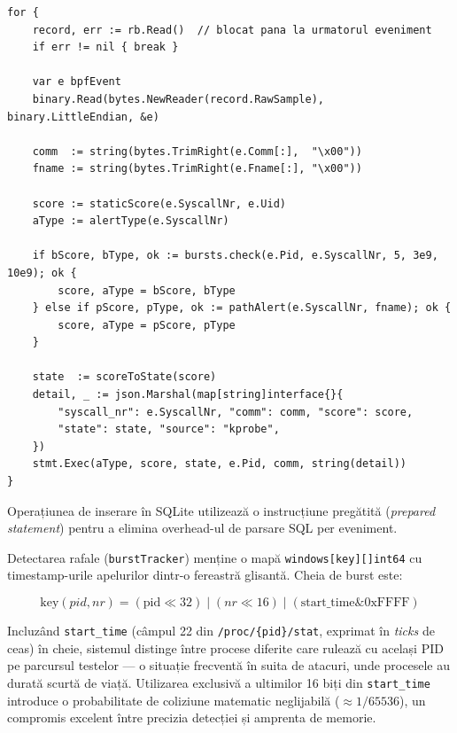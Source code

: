 \begin{lstlisting}[style=gostyle,caption={Bucla principală de procesare a evenimentelor din ring buffer}]
for {
    record, err := rb.Read()  // blocat pana la urmatorul eveniment
    if err != nil { break }

    var e bpfEvent
    binary.Read(bytes.NewReader(record.RawSample), binary.LittleEndian, &e)

    comm  := string(bytes.TrimRight(e.Comm[:],  "\x00"))
    fname := string(bytes.TrimRight(e.Fname[:], "\x00"))

    score := staticScore(e.SyscallNr, e.Uid)
    aType := alertType(e.SyscallNr)

    if bScore, bType, ok := bursts.check(e.Pid, e.SyscallNr, 5, 3e9, 10e9); ok {
        score, aType = bScore, bType
    } else if pScore, pType, ok := pathAlert(e.SyscallNr, fname); ok {
        score, aType = pScore, pType
    }

    state  := scoreToState(score)
    detail, _ := json.Marshal(map[string]interface{}{
        "syscall_nr": e.SyscallNr, "comm": comm, "score": score,
        "state": state, "source": "kprobe",
    })
    stmt.Exec(aType, score, state, e.Pid, comm, string(detail))
}
\end{lstlisting}

\par Operațiunea de inserare în SQLite utilizează o instrucțiune pregătită (\textit{prepared statement}) pentru a elimina overhead-ul de parsare SQL per eveniment.

\par Detectarea rafale (\texttt{burstTracker}) menține o mapă \texttt{windows[key][]int64} cu timestamp-urile apelurilor dintr-o fereastră glisantă. Cheia de burst este:

\begin{equation}
    \text{key}(pid, nr) = (\text{pid} \ll 32) \mid (nr \ll 16) \mid (\text{start\_time} \mathrel{\&} 0\text{xFFFF})
    \label{eq:burst_key}
\end{equation}

\par Incluzând \texttt{start\_time} (câmpul 22 din \texttt{/proc/\{pid\}/stat}, exprimat în \textit{ticks} de ceas) în cheie, sistemul distinge între procese diferite care rulează cu același PID pe parcursul testelor --- o situație frecventă în suita de atacuri, unde procesele au durată scurtă de viață. Utilizarea exclusivă a ultimilor 16 biți din \texttt{start\_time} introduce o probabilitate de coliziune matematic neglijabilă ($\approx 1/65536$), un compromis excelent între precizia detecției și amprenta de memorie.

